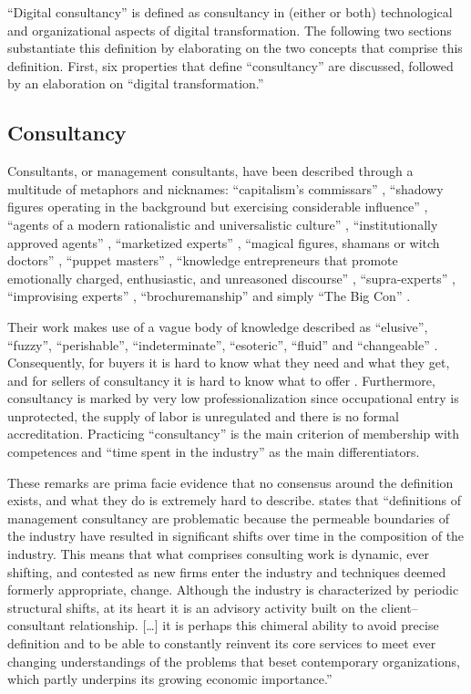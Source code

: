 \documentclass[12pt]{article}
\begin{document}
``Digital consultancy'' is defined as consultancy in (either or both)
technological and organizational aspects of digital transformation. The
following two sections substantiate this definition by elaborating on
the two concepts that comprise this definition. First, six properties
that define ``consultancy'' are discussed, followed by an elaboration on
``digital transformation.''

\subsection{Consultancy}\label{consultancy}

Consultants, or management consultants, have been described through a
multitude of metaphors and nicknames: ``capitalism's commissars''
\citep[ 93]{thrift2005}, ``shadowy figures operating in the background
but exercising considerable influence'' \citep[ 31]{kipping2012},
``agents of a modern rationalistic and universalistic culture'' \citep[
190]{kipping2012}, ``institutionally approved agents'' \citep[
193]{kipping2012}, ``marketized experts'' \citep[ 265]{furusten2012},
``magical figures, shamans or witch doctors'' \citep[ 68]{fincham2002},
``puppet masters'' \citep[ 69]{fincham2002}, ``knowledge entrepreneurs
that promote emotionally charged, enthusiastic, and unreasoned
discourse'' \citep[ 37]{leicht2006}, ``supra-experts'' \citep[
94]{kieser2006}, ``improvising experts'' \citep[ 272]{furusten2009},
``brochuremanship'' \citep[ 75]{levine1982} and simply ``The Big Con''
\citep{mazzucato2023}.

Their work makes use of a vague body of knowledge described as
``elusive'', ``fuzzy'', ``perishable'', ``indeterminate'', ``esoteric'',
``fluid'' and ``changeable'' \citep{muzio2011}. Consequently, for buyers
it is hard to know what they need and what they get, and for sellers of
consultancy it is hard to know what to offer \citep[ 266]{furusten2012}.
Furthermore, consultancy is marked by very low professionalization since
occupational entry is unprotected, the supply of labor is unregulated
and there is no formal accreditation. \citep[ 20]{fincham2006}
Practicing ``consultancy'' is the main criterion of membership with
competences and ``time spent in the industry'' as the main
differentiators.

These remarks are prima facie evidence that no consensus around the
definition exists, and what they do is extremely hard to describe.
\citet[24]{kipping2012} states that ``definitions of management
consultancy are problematic because the permeable boundaries of the
industry have resulted in significant shifts over time in the
composition of the industry. This means that what comprises consulting
work is dynamic, ever shifting, and contested as new firms enter the
industry and techniques deemed formerly appropriate, change. Although
the industry is characterized by periodic structural shifts, at its
heart it is an advisory activity built on the client--consultant
relationship. {[}\ldots{]} it is perhaps this chimeral ability to avoid
precise definition and to be able to constantly reinvent its core
services to meet ever changing understandings of the problems that beset
contemporary organizations, which partly underpins its growing economic
importance.''
\end{document}
